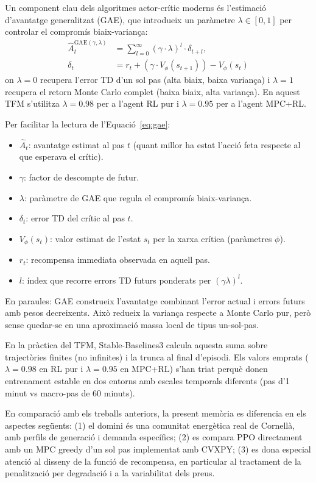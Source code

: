 \documentclass[a4paper,12pt,twoside]{ThesisStyle}
\begin{document}
Un component clau dels algoritmes actor-crític moderns és l'estimació d'avantatge generalitzat (GAE), que introdueix un paràmetre $\lambda \in [0,1]$ per controlar el compromís biaix-variança:
\begin{align}
  \hat{A}_t^{\mathrm{GAE}(\gamma,\lambda)} &= \sum_{l=0}^{\infty} \left(\gamma \cdot \lambda\right)^l \cdot \delta_{t+l}, \label{eq:gae}\\
  \delta_t &= r_t + \left(\gamma \cdot V_\phi(s_{t+1})\right) - V_\phi(s_t) \nonumber
\end{align}
on $\lambda=0$ recupera l'error TD d'un sol pas (alta biaix, baixa variança) i $\lambda=1$ recupera el retorn Monte Carlo complet (baixa biaix, alta variança). En aquest TFM s'utilitza $\lambda=0.98$ per a l'agent RL pur i $\lambda=0.95$ per a l'agent MPC+RL.

Per facilitar la lectura de l'Equació~\eqref{eq:gae}:
\begin{itemize}
  \item $\hat{A}_t$: avantatge estimat al pas $t$ (quant millor ha estat l'acció feta respecte al que esperava el crític).
  \item $\gamma$: factor de descompte de futur.
  \item $\lambda$: paràmetre de GAE que regula el compromís biaix-variança.
  \item $\delta_t$: error TD del crític al pas $t$.
  \item $V_\phi(s_t)$: valor estimat de l'estat $s_t$ per la xarxa crítica (paràmetres $\phi$).
  \item $r_t$: recompensa immediata observada en aquell pas.
  \item $l$: índex que recorre errors TD futurs ponderats per $(\gamma\lambda)^l$.
\end{itemize}

En paraules: GAE construeix l'avantatge combinant l'error actual i errors futurs amb pesos decreixents. Això redueix la variança respecte a Monte Carlo pur, però sense quedar-se en una aproximació massa local de tipus un-sol-pas.

En la pràctica del TFM, Stable-Baselines3 calcula aquesta suma sobre trajectòries finites (no infinites) i la trunca al final d'episodi. Els valors emprats ($\lambda=0.98$ en RL pur i $\lambda=0.95$ en MPC+RL) s'han triat perquè donen entrenament estable en dos entorns amb escales temporals diferents (pas d'1 minut vs macro-pas de 60 minuts).

En comparació amb els treballs anteriors, la present memòria es diferencia en els aspectes següents: (1) el domini és una comunitat energètica real de Cornellà, amb perfils de generació i demanda específics; (2) es compara PPO directament amb un MPC greedy d'un sol pas implementat amb CVXPY; (3) es dona especial atenció al disseny de la funció de recompensa, en particular al tractament de la penalització per degradació i a la variabilitat dels preus.
\end{document}
